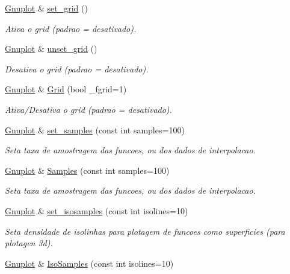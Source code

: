 \begin{DoxyCompactItemize}
\hyperlink{class_gnuplot}{Gnuplot} \& \hyperlink{class_gnuplot_a4b7245b12dad1c0ef326e5f59eb83001}{set\+\_\+grid} ()
\begin{DoxyCompactList}\small\item\em Ativa o grid (padrao = desativado). \end{DoxyCompactList}\item 
\hyperlink{class_gnuplot}{Gnuplot} \& \hyperlink{class_gnuplot_a8b9a16d5793c3f4939b917b2c263860c}{unset\+\_\+grid} ()
\begin{DoxyCompactList}\small\item\em Desativa o grid (padrao = desativado). \end{DoxyCompactList}\item 
\hyperlink{class_gnuplot}{Gnuplot} \& \hyperlink{class_gnuplot_a67e669cdac3b09ae16678f5211dda786}{Grid} (bool \+\_\+fgrid=1)
\begin{DoxyCompactList}\small\item\em Ativa/\+Desativa o grid (padrao = desativado). \end{DoxyCompactList}\item 
\hyperlink{class_gnuplot}{Gnuplot} \& \hyperlink{class_gnuplot_a671cbe7b18a267ea59f532c83a0035f6}{set\+\_\+samples} (const int samples=100)
\begin{DoxyCompactList}\small\item\em Seta taxa de amostragem das funcoes, ou dos dados de interpolacao. \end{DoxyCompactList}\item 
\hyperlink{class_gnuplot}{Gnuplot} \& \hyperlink{class_gnuplot_a0be7d1bfb41fd1e44969361ab02320b9}{Samples} (const int samples=100)
\begin{DoxyCompactList}\small\item\em Seta taxa de amostragem das funcoes, ou dos dados de interpolacao. \end{DoxyCompactList}\item 
\hyperlink{class_gnuplot}{Gnuplot} \& \hyperlink{class_gnuplot_ab810fa4c02fb49ae197786c305b78702}{set\+\_\+isosamples} (const int isolines=10)
\begin{DoxyCompactList}\small\item\em Seta densidade de isolinhas para plotagem de funcoes como superficies (para plotagen 3d). \end{DoxyCompactList}\item 
\hyperlink{class_gnuplot}{Gnuplot} \& \hyperlink{class_gnuplot_a215f314f3bcc2c869e7379a9728e5f95}{Iso\+Samples} (const int isolines=10)

\end{DoxyCompactItemize}
